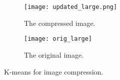 \begin{answer}
	\begin{figure}[H]
		\centering
		\begin{subfigure}[H]{0.45\linewidth}
			\texttt{[image: updated\_large.png]}
			\caption{The compressed image.}
		\end{subfigure}
		\begin{subfigure}[H]{0.45\linewidth}
			\texttt{[image: orig\_large]}
			\caption{The original image.}
		\end{subfigure}
		\caption{K-means for image compression.}
	\end{figure}
\end{answer}
